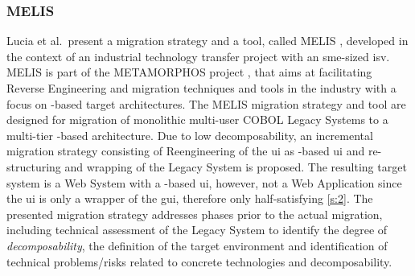 \vspace{-10pt}
\hypertarget{melis}{%
\subsubsection*{MELIS}\label{melis}}

Lucia et al.~present a migration strategy \autocite{Lucia2008,Lucia2006} and a tool, called MELIS \autocite{Colosimo2007ControlledExperiments}, developed in the context of an industrial technology transfer project with an \gls{sme}-sized \gls{isv}.
MELIS is part of the METAMORPHOS project \autocite{Lucia2009METAMORPHOS}, that aims at facilitating \gls{Reverse Engineering} and migration techniques and tools in the industry with a focus on -based target architectures.
The MELIS migration strategy and tool are designed for migration of monolithic multi-user COBOL \glspl{Legacy System} to a multi-tier -based architecture.
Due to low decomposability, an incremental migration strategy consisting of \gls{Reengineering} of the \gls{ui} as -based \gls{ui} and re-structuring and wrapping of the \gls{Legacy System} is proposed.
The resulting \gls{target system} is a \gls{Web System} with a -based \gls{ui}, however, not a \gls{Web Application} since the \gls{ui} is only a wrapper of the  \gls{gui}, therefore only half-satisfying \cref{s:2}.
The presented migration strategy addresses phases prior to the actual migration, including technical assessment of the \gls{Legacy System} to identify the degree of \emph{decomposability}, the definition of the target environment and identification of technical problems/risks related to concrete technologies and decomposability.

